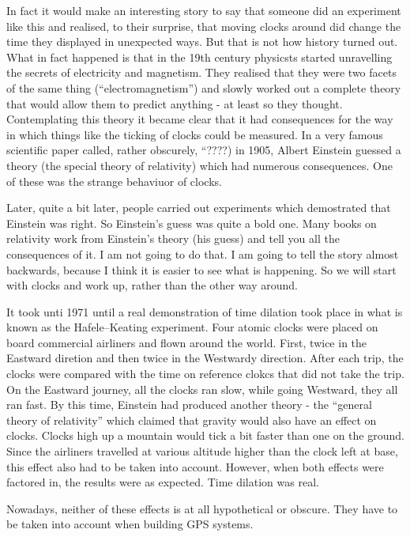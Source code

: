 \documentclass[a4paper]{report}
\begin{document}
In fact it would make an interesting story to say that someone did an experiment like this and realised, to their surprise, that moving clocks around did change the time they displayed in unexpected ways. But that is not how history turned out. What in fact happened is that in the 19th century physicsts started unravelling the secrets of electricity and magnetism. They realised that they were two facets of the same thing (``electromagnetism'') and slowly worked out a complete theory that would allow them to predict anything - at least so they thought. Contemplating this theory it became clear that it had consequences for the way in which things like the ticking of clocks could be measured. In a very famous scientific paper called, rather obscurely, ``????) in 1905, Albert Einstein guessed a theory (the special theory of relativity) which had numerous consequences. One of these was the strange behaviuor of clocks.

Later, quite a bit later, people carried out experiments which demostrated that Einstein was right. So Einstein's guess was quite a bold one. Many books on relativity work from Einstein's theory (his guess) and tell you all the consequences of it. I am not going to do that. I am going to tell the story almost backwards, because I think it is easier to see what is happening. So we will start with clocks and work up, rather than the other way around.

It took unti 1971 until a real demonstration of time dilation took place in what is known as the Hafele–Keating experiment. Four atomic clocks were placed on board commercial airliners and flown around the world. First, twice in the Eastward diretion and then twice in the Westwardy direction. After each trip, the clocks were compared with the time on reference clokcs that did not take the trip. On the Eastward journey, all the clocks ran slow, while going Westward, they all ran fast. By this time, Einstein had produced another theory - the ``general theory of relativity'' which claimed that gravity would also have an effect on clocks. Clocks high up a mountain would tick a bit faster than one on the ground. Since the airliners travelled at various altitude higher than the clock left at base, this effect also had to be taken into account. However, when both effects were factored in, the results were as expected. Time dilation was real.

Nowadays, neither of these effects is at all hypothetical or obscure. They have to be taken into account when building GPS systems.
\end{document}
